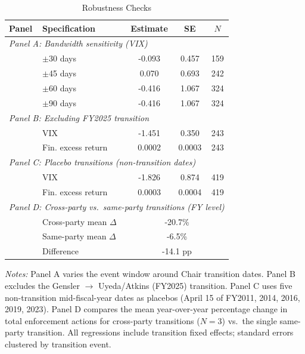 \begin{table}[t]
\centering
\caption{Robustness Checks}
\label{tab:robustness}
\small
\begin{tabular}{llccc}
\toprule
Panel & Specification & Estimate & SE & $N$ \\
\midrule
\multicolumn{5}{l}{\textit{Panel A: Bandwidth sensitivity (VIX)}} \\
 & $\pm$30 days & -0.093 & 0.457 & 159 \\
 & $\pm$45 days & 0.070 & 0.693 & 242 \\
 & $\pm$60 days & -0.416 & 1.067 & 324 \\
 & $\pm$90 days & -0.416 & 1.067 & 324 \\
\midrule
\multicolumn{5}{l}{\textit{Panel B: Excluding FY2025 transition}} \\
 & VIX & -1.451 & 0.350 & 243 \\
 & Fin. excess return & 0.0002 & 0.0003 & 243 \\
\midrule
\multicolumn{5}{l}{\textit{Panel C: Placebo transitions (non-transition dates)}} \\
 & VIX & -1.826 & 0.874 & 419 \\
 & Fin. excess return & 0.0003 & 0.0004 & 419 \\
\midrule
\multicolumn{5}{l}{\textit{Panel D: Cross-party vs.\ same-party transitions (FY level)}} \\
 & Cross-party mean $\Delta$ & \multicolumn{3}{c}{-20.7\%} \\
 & Same-party mean $\Delta$ & \multicolumn{3}{c}{-6.5\%} \\
 & Difference & \multicolumn{3}{c}{-14.1 pp} \\
\bottomrule
\end{tabular}
\begin{tablenotes}
\item \textit{Notes:} Panel A varies the event window around Chair transition dates. Panel B excludes the Gensler $\rightarrow$ Uyeda/Atkins (FY2025) transition. Panel C uses five non-transition mid-fiscal-year dates as placebos (April 15 of FY2011, 2014, 2016, 2019, 2023). Panel D compares the mean year-over-year percentage change in total enforcement actions for cross-party transitions ($N=3$) vs.\ the single same-party transition. All regressions include transition fixed effects; standard errors clustered by transition event.
\end{tablenotes}
\end{table}

